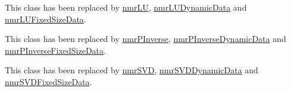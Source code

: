
\begin{DoxyRefList}
\item[\label{deprecated__deprecated000001}%
\hypertarget{deprecated__deprecated000001}{}%
Class \hyperlink{classnmr_l_u_solver}{nmr\-L\-U\-Solver} ]This class has been replaced by \hyperlink{nmr_l_u_8h_a66bf403c705953a781e940cf1b674d5f}{nmr\-L\-U}, \hyperlink{classnmr_l_u_dynamic_data}{nmr\-L\-U\-Dynamic\-Data} and \hyperlink{classnmr_l_u_fixed_size_data}{nmr\-L\-U\-Fixed\-Size\-Data}.  
\item[\label{deprecated__deprecated000002}%
\hypertarget{deprecated__deprecated000002}{}%
Class \hyperlink{classnmr_p_inverse_solver}{nmr\-P\-Inverse\-Solver} ]This class has been replaced by \hyperlink{nmr_p_inverse_8h_a0694f8540c064c2aa6d8dbe488238462}{nmr\-P\-Inverse}, \hyperlink{classnmr_p_inverse_dynamic_data}{nmr\-P\-Inverse\-Dynamic\-Data} and \hyperlink{classnmr_p_inverse_fixed_size_data}{nmr\-P\-Inverse\-Fixed\-Size\-Data}.  
\item[\label{deprecated__deprecated000003}%
\hypertarget{deprecated__deprecated000003}{}%
Class \hyperlink{classnmr_s_v_d_solver}{nmr\-S\-V\-D\-Solver} ]This class has been replaced by \hyperlink{nmr_s_v_d_8h_a52115d0e7a485c4494aa20f4f3f4ebe7}{nmr\-S\-V\-D}, \hyperlink{classnmr_s_v_d_dynamic_data}{nmr\-S\-V\-D\-Dynamic\-Data} and \hyperlink{classnmr_s_v_d_fixed_size_data}{nmr\-S\-V\-D\-Fixed\-Size\-Data}. 
\end{DoxyRefList}